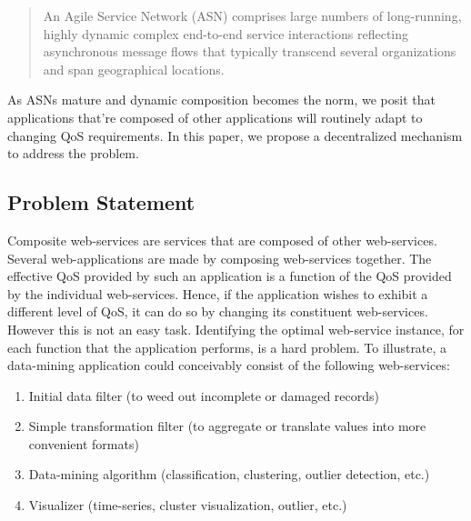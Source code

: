 \documentclass[10pt,journal,compsoc]{IEEEtran}
\begin{document}
\begin{quote}
An Agile Service Network (ASN) comprises large numbers of long-running, highly dynamic complex end-to-end service interactions reflecting asynchronous message flows that typically transcend several organizations and span geographical locations. 
\end{quote}
As ASNs mature and dynamic composition becomes the norm, we posit that applications that're composed of other applications will routinely adapt to changing QoS requirements. In this paper, we propose a decentralized mechanism to address the problem.  
\subsection{Problem Statement}
Composite web-services are services that are composed of other web-services. Several web-applications are made by composing web-services together. The effective QoS provided by such an application is a function of the QoS provided by the individual web-services. Hence, if the application wishes to exhibit a different level of QoS, it can do so by changing its constituent web-services. However this is not an easy task. Identifying the optimal web-service instance, for each function that the application performs, is a hard problem. To illustrate, a data-mining application could conceivably consist of the following web-services:
	    \begin{enumerate}
	        \item Initial data filter (to weed out incomplete or damaged records)
		\item Simple transformation filter (to aggregate or translate values into more convenient formats)
		\item Data-mining algorithm (classification, clustering, outlier detection, etc.)
		\item Visualizer (time-series, cluster visualization, outlier, etc.)
	    \end{enumerate}
\end{document}
